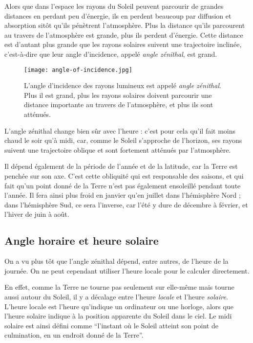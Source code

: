 \documentclass[12pt]{article}
\begin{document}
Alors que dans l'espace les rayons du Soleil peuvent parcourir de grandes distances en perdant peu d'énergie, ils en perdent beaucoup par diffusion et absorption sitôt qu'ils pénètrent l'atmosphère.
Plus la distance qu'ils parcourent au travers de l'atmosphère est grande, plus ils perdent d'énergie.
Cette distance est d'autant plus grande que les rayons solaires suivent une trajectoire inclinée, c'est-à-dire que leur angle d'incidence, appelé \emph{angle zénithal}, est grand.

 \begin{figure}[H]
	\centerline{\texttt{[image: angle-of-incidence.jpg]}}
	\caption{L'angle d'incidence des rayons lumineux est appelé \emph{angle zénithal}. Plus il est grand, plus les rayons solaires doivent parcourir une distance importante au travers de l'atmosphère, et plus ils sont atténués.}
	\label{fig:angle-of-incidence}
\end{figure}

L'angle zénithal change bien sûr avec l'heure : c'est pour cela qu'il fait moins chaud le soir qu'à midi, car, comme le Soleil s'approche de l'horizon, ses rayons suivent une trajectoire oblique et sont fortement atténués par l'atmosphère.

Il dépend également de la période de l'année et de la latitude, car la Terre est penchée sur son axe.
C'est cette obliquité qui est responsable des saisons, et qui fait qu'un point donné de la Terre n'est pas également ensoleillé pendant toute l'année.
Il fera ainsi plus froid en janvier qu'en juillet dans l'hémisphère Nord ; dans l'hémisphère Sud, ce sera l'inverse, car l'été y dure de décembre à février, et l'hiver de juin à août.

\subsection{Angle horaire et heure solaire}

On a vu plus tôt que l'angle zénithal dépend, entre autres, de l'heure de la journée.
On ne peut cependant utiliser l'heure locale pour le calculer directement.

En effet, comme la Terre ne tourne pas seulement sur elle-même mais tourne aussi autour du Soleil, il y a décalage entre l'heure \emph{locale} et l'heure \emph{solaire}.
L'heure locale est l'heure qu'indique un ordinateur ou une horloge, alors que l'heure solaire indique à la position apparente du Soleil dans le ciel.
Le midi solaire est ainsi défini comme ``l'instant où le Soleil atteint son point de culmination, en un endroit donné de la Terre''\cite{temps_solaire_wiki}.
\end{document}
